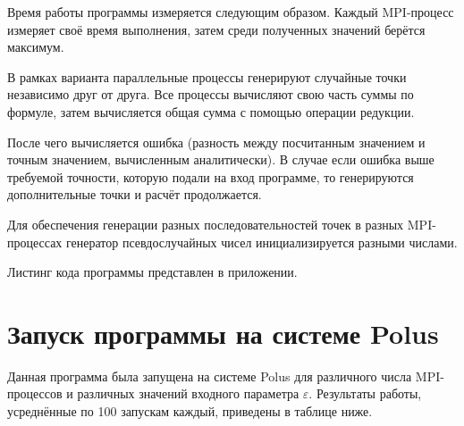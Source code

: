     Время работы программы измеряется следующим образом. Каждый MPI-процесс измеряет своё время выполнения, затем среди полученных значений берётся максимум.

    В рамках варианта параллельные процессы генерируют случайные точки независимо друг от друга.
    Все процессы вычисляют свою часть суммы по формуле, затем вычисляется общая сумма с помощью операции редукции.

    После чего вычисляется ошибка (разность между посчитанным значением и точным значением, вычисленным аналитически).
    В случае если ошибка выше требуемой точности, которую подали на вход программе, то генерируются дополнительные точки и расчёт продолжается.

    Для обеспечения генерации разных последовательностей точек в разных MPI-процессах генератор псевдослучайных чисел инициализируется разными числами.

    Листинг кода программы представлен в приложении.

    \section{Запуск программы на системе Polus}
    Данная программа была запущена на системе Polus для различного числа MPI-процессов и различных значений входного параметра $\varepsilon$.
    Результаты работы, усреднённые по 100 запускам каждый, приведены в таблице ниже.

